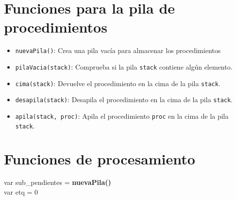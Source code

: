 \section{Funciones para la pila de procedimientos}

\begin{itemize}
    \item \texttt{nuevaPila()}: Crea una pila vacía para almacenar los procedimientos
    \item \texttt{pilaVacia(stack)}: Comprueba si la pila \texttt{stack} contiene algún elemento.
    \item \texttt{cima(stack)}: Devuelve el procedimiento en la cima de la pila \texttt{stack}.
    \item \texttt{desapila(stack)}: Desapila el procedimiento en la cima de la pila \texttt{stack}.
    \item \texttt{apila(stack, proc)}: Apila el procedimiento \texttt{proc} en la cima de la pila \texttt{stack}.
\end{itemize}

\section{Funciones de procesamiento}

var sub\_pendientes = \textbf{nuevaPila()} \\
var etq = 0

